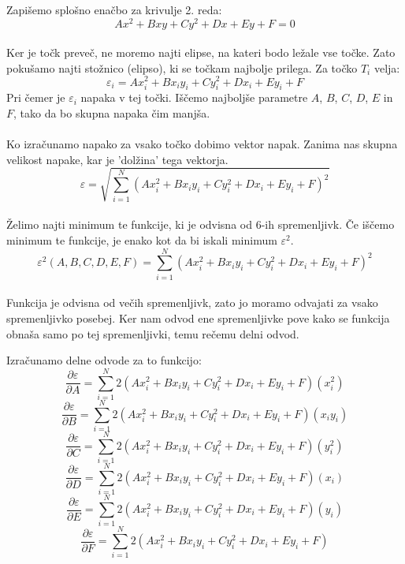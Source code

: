 \documentclass[a4paper, 12pt]{article}
\begin{document}
	Zapišemo splošno enačbo za krivulje 2. reda:
	$$Ax^2 + Bxy + Cy^2 + Dx + Ey + F = 0$$

	\paragraph{}
	Ker je točk preveč, ne moremo najti elipse, na kateri bodo ležale vse točke. Zato pokušamo najti stožnico (elipso), ki se točkam najbolje prilega. Za točko $T_i$ velja:
	$$\varepsilon_i = Ax_i^2 + Bx_iy_i + Cy_i^2 + Dx_i + Ey_i + F$$
	Pri čemer je $\varepsilon_i$ napaka v tej točki. Iščemo najboljše parametre $A$, $B$, $C$, $D$, $E$ in $F$, tako da bo skupna napaka čim manjša.

	\paragraph{}
	Ko izračunamo napako za vsako točko dobimo vektor napak. Zanima nas skupna velikost napake, kar je 'dolžina' tega vektorja.
	$$\varepsilon = \sqrt{\sum_{i=1}^{N} (Ax_i^2 + Bx_iy_i + Cy_i^2 + Dx_i + Ey_i + F)^2}$$

	\paragraph{}
	Želimo najti minimum te funkcije, ki je odvisna od 6-ih spremenljivk. Če iščemo minimum te funkcije, je enako kot da bi iskali minimum $\varepsilon^{2}$.
	$$\varepsilon^2(A, B, C, D, E, F) = \sum_{i=1}^{N} (Ax_i^2 + Bx_iy_i + Cy_i^2 + Dx_i + Ey_i + F)^2$$

	\paragraph{}
	Funkcija je odvisna od večih spremenljivk, zato jo moramo odvajati za vsako spremenljivko posebej. Ker nam odvod ene spremenljivke pove kako se funkcija obnaša samo po tej spremenljivki, temu rečemu delni odvod.

	Izračunamo delne odvode za to funkcijo:
	$$\frac{\partial \varepsilon}{\partial A} = \sum_{i=1}^{N}2(Ax_i^2 + Bx_iy_i + Cy_i^2 + Dx_i + Ey_i + F)(x_i^2)$$
	$$\frac{\partial \varepsilon}{\partial B} = \sum_{i=1}^{N}2(Ax_i^2 + Bx_iy_i + Cy_i^2 + Dx_i + Ey_i + F)(x_iy_i)$$
	$$\frac{\partial \varepsilon}{\partial C} = \sum_{i=1}^{N}2(Ax_i^2 + Bx_iy_i + Cy_i^2 + Dx_i + Ey_i + F)(y_i^2)$$
	$$\frac{\partial \varepsilon}{\partial D} = \sum_{i=1}^{N}2(Ax_i^2 + Bx_iy_i + Cy_i^2 + Dx_i + Ey_i + F)(x_i)$$
	$$\frac{\partial \varepsilon}{\partial E} = \sum_{i=1}^{N}2(Ax_i^2 + Bx_iy_i + Cy_i^2 + Dx_i + Ey_i + F)(y_i)$$
	$$\frac{\partial \varepsilon}{\partial F} = \sum_{i=1}^{N}2(Ax_i^2 + Bx_iy_i + Cy_i^2 + Dx_i + Ey_i + F)$$
\end{document}
